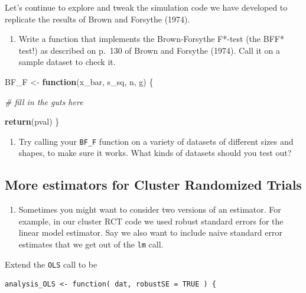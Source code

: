 \documentclass[
]{book}
\newenvironment{Shaded}{\begin{snugshade}}{\end{snugshade}}
\newcommand{\CommentTok}[1]{\textcolor[rgb]{0.56,0.35,0.01}{\textit{#1}}}
\newcommand{\ControlFlowTok}[1]{\textcolor[rgb]{0.13,0.29,0.53}{\textbf{#1}}}
\newcommand{\FunctionTok}[1]{\textcolor[rgb]{0.13,0.29,0.53}{\textbf{#1}}}
\newcommand{\NormalTok}[1]{#1}
\newcommand{\OtherTok}[1]{\textcolor[rgb]{0.56,0.35,0.01}{#1}}
\providecommand{\tightlist}{%
  \setlength{\itemsep}{0pt}\setlength{\parskip}{0pt}}
\begin{document}
Let's continue to explore and tweak the simulation code we have developed to replicate the results of Brown and Forsythe (1974).

\begin{enumerate}
\def\labelenumi{\arabic{enumi}.}
\tightlist
\item
  Write a function that implements the Brown-Forsythe F*-test (the BFF* test!) as described on p.~130 of Brown and Forsythe (1974).
  Call it on a sample dataset to check it.
\end{enumerate}

\begin{Shaded}
\begin{Highlighting}[]
\NormalTok{BF\_F }\OtherTok{\textless{}{-}} \ControlFlowTok{function}\NormalTok{(x\_bar, s\_sq, n, g) \{}
  
  \CommentTok{\# fill in the guts here}
  
  \FunctionTok{return}\NormalTok{(pval)}
\NormalTok{\}}
\end{Highlighting}
\end{Shaded}

\begin{enumerate}
\def\labelenumi{\arabic{enumi}.}
\setcounter{enumi}{1}
\tightlist
\item
  Try calling your \texttt{BF\_F} function on a variety of datasets of different sizes and shapes, to make sure it works. What kinds of datasets should you test out?
\end{enumerate}

\subsection{More estimators for Cluster Randomized Trials}\label{more-estimators-for-cluster-randomized-trials}

\begin{enumerate}
\def\labelenumi{\arabic{enumi}.}
\setcounter{enumi}{2}
\tightlist
\item
  Sometimes you might want to consider two versions of an estimator. For example, in our cluster RCT code we used robust standard errors for the linear model estimator. Say we also want to include naive standard error estimates that we get out of the \texttt{lm} call.
\end{enumerate}

Extend the \texttt{OLS} call to be

\begin{verbatim}
analysis_OLS <- function( dat, robustSE = TRUE ) {
\end{verbatim}
\end{document}
